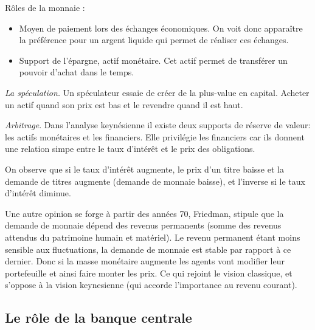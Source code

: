 \begin{tcolorbox}[title=La demande de monnaie dans une économie keynésienne simplifiée]
	Rôles de la monnaie : 
	\begin{itemize}
		\item Moyen de paiement lors des échanges économiques. On voit donc apparaître la préférence pour un argent liquide qui permet de réaliser ces échanges.
		\item Support de l'épargne, actif monétaire. Cet actif permet de transférer un pouvoir d'achat dans le temps.
	\end{itemize}

\emph{La spéculation.} Un spéculateur essaie de créer de la plus-value en capital. Acheter un actif quand son prix est bas et le revendre quand il est haut.

\emph{Arbitrage}. Dans l'analyse keynésienne il existe deux supports de réserve de valeur: les actifs monétaires et les financiers. Elle privilégie les 
financiers car ils donnent une relation simpe entre le taux d'intérêt et le prix des obligations. 

On observe que si le taux d'intérêt augmente, le prix d'un titre baisse et la demande de titres augmente (demande de monnaie baisse), et l'inverse si le taux
d'intérêt diminue.
	
\end{tcolorbox}

Une autre opinion se forge à partir des années 70, Friedman, stipule que la demande de monnaie dépend des revenus permanents (somme des revenus attendus du 
patrimoine humain et matériel). Le revenu permanent étant moins sensible aux fluctuations, la demande de monnaie est stable par rapport à ce dernier. 
Donc si la masse monétaire augmente les agents vont modifier leur portefeuille et ainsi faire monter les prix. Ce qui rejoint le vision classique, et 
s'oppose à la vision keynesienne (qui accorde l'importance au revenu courant).





\subsection{Le rôle de la banque centrale} %
\label{sec:le_role_de_la_banque_centrale}

